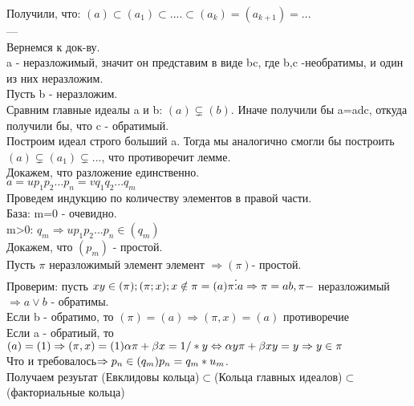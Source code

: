 \documentclass{article}
\begin{document}
Получили, что: $(a) \subset (a_1) \subset.... \subset(a_k)=(a_{k+1})=... $\\
---\\
Вернемся к док-ву.\\
a - неразложимый, значит он представим в виде bc, где b,c -необратимы, и один из них неразложим.\\
Пусть b - неразложим.\\
Сравним главные идеалы a и b: $(a) \varsubsetneq (b)$. Иначе получили бы a=adc, откуда получили бы, что c - обратимый.\\
Построим идеал строго больший a. Тогда мы аналогично смогли бы построить $(a)\varsubsetneq (a_1)\varsubsetneq ...$, что противоречит лемме.\\
Докажем, что разложение единственно.\\
$a=up_1p_2...p_n=vq_1q_2...q_m$\\
Проведем индукцию по количеству элементов в правой части.\\
База: m=0 - очевидно.\\
m>0: $q_m \Rightarrow up_1p_2...p_n \in (q_m)$\\
Докажем, что $(p_m)$ - простой.\\
Пусть $\pi$ неразложимый элемент элемент $\Rightarrow (\pi)$- простой.\\
Проверим: пусть $xy\in (\pi); (\pi;x);x\notin \pi = (a)\\
\pi \vdots a \Rightarrow \pi = ab, \pi -$ неразложимый$\Rightarrow a \vee b$ - обратимы.\\
Если b - обратимо, то $(\pi) = (a) \Rightarrow (\pi, x) = (a)$ противоречие\\
Если a - обратиый, то $(a)=(1) \Rightarrow (\pi,x)=(1)\\
\alpha \pi + \beta x =1 /*y \Leftrightarrow \alpha y \pi + \beta xy=y \Rightarrow y\in \pi$\\
Что и требовалось$\Rightarrow p_n \in (q_m)\\
p_n = q_m*u_m$.\\
Получаем резуьтат (Евклидовы кольца)$\subset$(Кольца главных идеалов)$\subset$(факториальные кольца)
\end{document}
